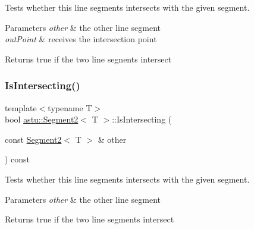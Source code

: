 Tests whether this line segments intersects with the given segment.


\begin{DoxyParams}{Parameters}
{\em other} & the other line segment \\
\hline
{\em out\+Point} & receives the intersection point \\
\hline
\end{DoxyParams}
\begin{DoxyReturn}{Returns}
{\ttfamily true} if the two line segnents intersect 
\end{DoxyReturn}
\mbox{\label{classastu_1_1Segment2_a88cf4a6cf9a15fe37fa5d43dd65267ed}} 
\subsubsection{\texorpdfstring{Is\+Intersecting()}{IsIntersecting()}\hspace{0.1cm}{\footnotesize\ttfamily [1/2]}}
{\footnotesize\ttfamily template$<$typename T$>$ \\
bool \hyperlink{classastu_1_1Segment2}{astu\+::\+Segment2}$<$ T $>$\+::Is\+Intersecting (\begin{DoxyParamCaption}\item[{const \hyperlink{classastu_1_1Segment2}{Segment2}$<$ T $>$ \&}]{other }\end{DoxyParamCaption}) const\hspace{0.3cm}{\ttfamily [inline]}}

Tests whether this line segments intersects with the given segment.


\begin{DoxyParams}{Parameters}
{\em other} & the other line segment \\
\hline
\end{DoxyParams}
\begin{DoxyReturn}{Returns}
{\ttfamily true} if the two line segments intersect 
\end{DoxyReturn}
\mbox{\label{classastu_1_1Segment2_a793214d60a3b15a08cfd505da4d24455}} 
